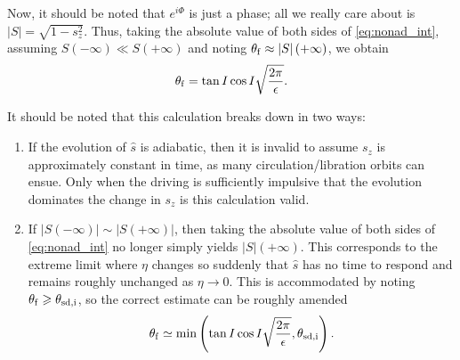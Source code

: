 \documentclass[
        fleqn,
        usenatbib,
        referee,
    ]{mnras}
\newcommand*{\abs}[1]{\left|#1\right|}
\newcommand*{\p}[1]{\left(#1\right)}
\begin{document}
Now, it should be noted that $e^{i\Phi}$ is just a phase; all we really care
about is $\abs{S} = \sqrt{1 - s_z^2}$. Thus, taking the absolute value of both
sides of \autoref{eq:nonad_int}, assuming $S\p{-\infty} \ll S\p{+\infty}$ and
noting $\theta_{\rm f} \approx \abs{S}(+\infty)$, we obtain
\begin{equation}
    \theta_{\rm f} = \tan I\cos I\sqrt{\frac{2\pi}{\epsilon}}.
        \label{eq:nonad_dong}
\end{equation}

It should be noted that this calculation breaks down in two ways:
\begin{enumerate}
    \item If the evolution of $\hat{s}$ is adiabatic, then it is invalid to
        assume $s_z$ is approximately constant in time, as many
        circulation/libration orbits can ensue. Only when the driving is
        sufficiently impulsive that the evolution dominates the change in $s_z$
        is this calculation valid.

    \item If $\abs{S\p{-\infty}} \sim \abs{S\p{+\infty}}$, then taking the
        absolute value of both sides of \autoref{eq:nonad_int} no longer simply
        yields $\abs{S}\p{+\infty}$. This corresponds to the extreme limit
        where $\eta$ changes so suddenly that $\hat{s}$ has no time to respond
        and remains roughly unchanged as $\eta \to 0$. This is accommodated by
        noting $\theta_{\rm f} \geq \theta_{\rm sd, i}$, so the correct estimate can be
        roughly amended
        \begin{equation}
            \theta_{\rm f} \simeq \min\p{\tan I\cos
                I\sqrt{\frac{2\pi}{\epsilon}}, \theta_{\rm sd, i}}.
        \end{equation}
\end{enumerate}

\bsp
\label{lastpage} %
\end{document}
